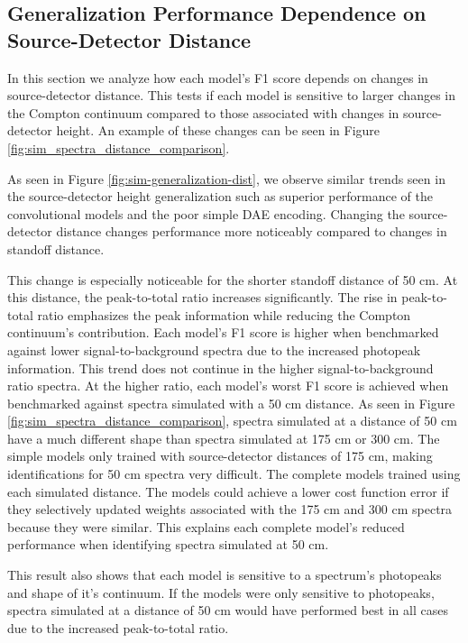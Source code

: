 \subsection{Generalization Performance Dependence on Source-Detector Distance}

In this section we analyze how each model's F1 score depends on changes in source-detector distance. This tests if each model is sensitive to larger changes in the Compton continuum compared to those associated with changes in source-detector height. An example of these changes can be seen in Figure \ref{fig:sim_spectra_distance_comparison}.

As seen in Figure \ref{fig:sim-generalization-dist}, we observe similar trends seen in the source-detector height generalization such as superior performance of the convolutional models and the poor simple DAE encoding. Changing the source-detector distance changes performance more noticeably compared to changes in standoff distance.

This change is especially noticeable for the shorter standoff distance of 50 cm. At this distance, the peak-to-total ratio increases significantly. The rise in peak-to-total ratio emphasizes the peak information while reducing the Compton continuum's contribution. Each model's F1 score is higher when benchmarked against lower signal-to-background spectra due to the increased photopeak information. This trend does not continue in the higher signal-to-background ratio spectra. At the higher ratio, each model's worst F1 score is achieved when benchmarked against spectra simulated with a 50 cm distance. As seen in Figure \ref{fig:sim_spectra_distance_comparison}, spectra simulated at a distance of 50 cm have a much different shape than spectra simulated at 175 cm or 300 cm. The simple models only trained with source-detector distances of 175 cm, making identifications for 50 cm spectra very difficult. The complete models trained using each simulated distance. The models could achieve a lower cost function error if they selectively updated weights associated with the 175 cm and 300 cm spectra because they were similar. This explains each complete model's reduced performance when identifying spectra simulated at 50 cm. 

This result also shows that each model is sensitive to a spectrum's photopeaks and shape of it's continuum. If the models were only sensitive to photopeaks, spectra simulated at a distance of 50 cm would have performed best in all cases due to the increased peak-to-total ratio.


